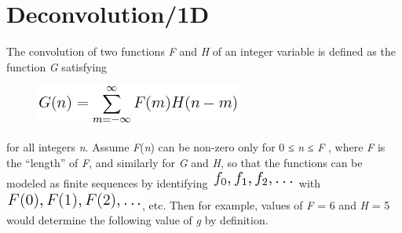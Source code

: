 \pagebreak{}
\section*{Deconvolution/1D}

The convolution of two functions \emph{F} and \emph{H} of an integer
variable is defined as the function \emph{G} satisfying

\begin{figure}[H]
\centering
\includegraphics[scale=.6]{graphics/e4e4d6b17e1e15dbddc307340f0a620f.png}
\end{figure}

for all integers \emph{n}. Assume \emph{F}(\emph{n}) can be non-zero
only for 0 ≤ \emph{n} ≤ \textbar{} \emph{F} \textbar{} , where
\textbar{} \emph{F} \textbar{} is the ``length'' of \emph{F}, and
similarly for \emph{G} and \emph{H}, so that the functions can be
modeled as finite sequences by identifying
\includegraphics[scale=.6]{graphics/b14d36d888dae449d5c4fcfb6f4ff8ce.png}
with
\includegraphics[scale=.6]{graphics/2eb0e52a9d4ca2a57f0a0ceaca866399.png},
etc. Then for example, values of \textbar{} \emph{F} \textbar{} = 6 and
\textbar{} \emph{H} \textbar{} = 5 would determine the following value
of \emph{g} by definition.

